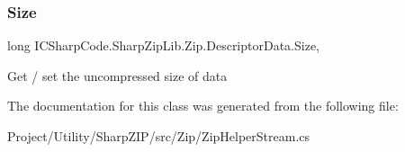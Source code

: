 \subsubsection{\texorpdfstring{Size}{Size}}
{\footnotesize\ttfamily long I\+C\+Sharp\+Code.\+Sharp\+Zip\+Lib.\+Zip.\+Descriptor\+Data.\+Size\hspace{0.3cm}{\ttfamily [get]}, {\ttfamily [set]}}



Get / set the uncompressed size of data 



The documentation for this class was generated from the following file\+:\begin{DoxyCompactItemize}
\item 
Project/\+Utility/\+Sharp\+Z\+I\+P/src/\+Zip/Zip\+Helper\+Stream.\+cs\end{DoxyCompactItemize}

